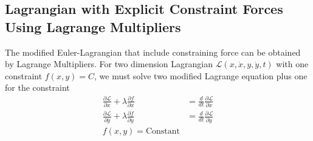\documentclass[../../../main.tex]{subfiles}
\begin{document}
\subsection*{Lagrangian with Explicit Constraint Forces Using Lagrange Multipliers}
The modified Euler-Lagrangian that include constraining force can be obtained by Lagrange Multipliers.
For two dimension Lagrangian $\mathcal{L}(x,\dot{x},y,\dot{y},t)$ with one constraint $f(x,y)=C$, we must solve two modified Lagrange equation plus one for the constraint
\begin{align*}
	\frac{\partial \mathcal{L}}{\partial x}+\lambda\frac{\partial f}{\partial x} & =\frac{d}{dt}\frac{\partial \mathcal{L}}{\partial \dot{x}} \\
	\frac{\partial \mathcal{L}}{\partial y}+\lambda\frac{\partial f}{\partial y} & =\frac{d}{dt}\frac{\partial \mathcal{L}}{\partial \dot{y}} \\
	f(x,y)=\text{Constant}
\end{align*}
\end{document}
